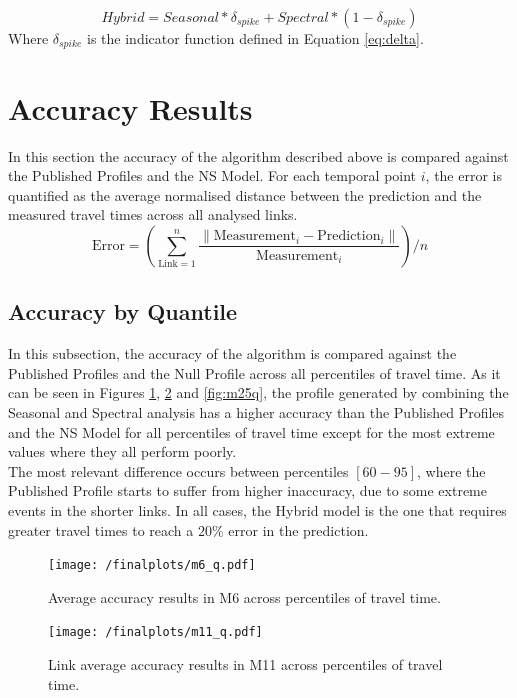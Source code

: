 \documentclass[conference]{IEEEtran}
\begin{document}
\begin{equation}
Hybrid = Seasonal * \delta_{spike} + Spectral * (1 - \delta_{spike})
\end{equation}
Where $\delta_{spike}$ is the indicator function defined in Equation \eqref{eq:delta}.

\section{Accuracy Results}
In this section the accuracy of the algorithm described above is compared against the Published Profiles and the NS Model. 
For each temporal point $i$, the error is quantified as the average normalised distance between the prediction and the measured travel times across all analysed links.
\begin{equation}
\textrm{Error} = \left( \sum_{\textrm{Link}=1}^{n} \frac{\|\textrm{Measurement}_i - \textrm{Prediction}_i\|}{\textrm{Measurement}_i}\right) /n 
\end{equation}
\subsection{Accuracy by Quantile}
In this subsection, the accuracy of the algorithm is compared against the Published Profiles and the Null Profile across all percentiles of travel time.
As it can be seen in Figures \ref{fig:m6q}, \ref{fig:m11q} and \ref{fig:m25q}, the profile generated by combining the Seasonal and Spectral analysis has a higher accuracy than the Published Profiles and the NS Model for all percentiles of travel time except for the most extreme values where they all perform poorly.\\
The most relevant difference occurs between percentiles $[60-95]$, where the Published Profile starts to suffer from higher inaccuracy, due to some extreme events in the shorter links. 
In all cases, the Hybrid model is the one that requires greater travel times to reach a $20\%$ error in the prediction.
\begin{figure}[htbp]
	\centerline{\texttt{[image: /finalplots/m6\_q.pdf]}}
	\caption{Average accuracy results in M6 across percentiles of travel time.}
	\label{fig:m6q}
\end{figure}

\begin{figure}[htbp]
	\centering
	\texttt{[image: /finalplots/m11\_q.pdf]}
	\caption{Link average accuracy results in M11 across percentiles of travel time.}
	\label{fig:m11q}
\end{figure}
\end{document}
